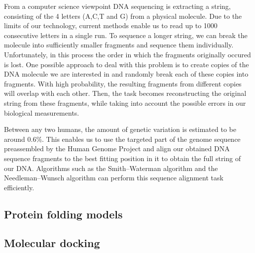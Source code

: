 From a computer science viewpoint DNA sequencing is extracting a string, consisting of the 4 letters (A,C,T and G) from a physical molecule. Due to the limits of our technology, current methods enable us to read up to 1000 consecutive letters in a single run. To sequence a longer string, we can break the molecule into sufficiently smaller fragments and sequence them individually. Unfortunately, in this process the order in which the fragments originally occured is lost. One possible approach to deal with this problem is to create copies of the DNA molecule we are interested in and randomly break each of these copies into fragments. With high probability, the resulting fragments from different copies will overlap with each other. Then, the task becomes reconstructing the original string from these fragments, while taking into account the possible errors in our biological measurements.

Between any two humans, the amount of genetic variation is estimated to be around 0.6\%\cite{the_1000_genomes_project_consortium_global_2015}. This enables us to use the targeted part of the genome sequence preassembled by the Human Genome Project and align our obtained DNA sequence fragments to the best fitting position in it to obtain the full string of our DNA. Algorithms such as the Smith–Waterman algorithm and the Needleman–Wunsch algorithm can perform this sequence alignment task efficiently.

\subsection{Protein folding models}

\subsection{Molecular docking}

